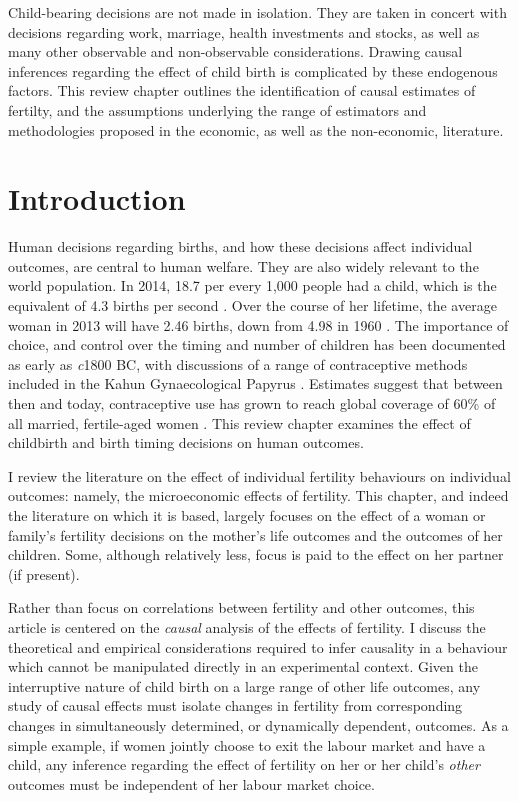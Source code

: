 \begin{chapabstract}
Child-bearing decisions are not made in isolation.  They are taken in concert 
with decisions regarding work, marriage, health investments and stocks, as well 
as many other observable and non-observable considerations.  Drawing causal 
inferences regarding the effect of child birth is complicated by these 
endogenous factors.  This review chapter outlines the identification of causal
estimates of fertilty, and the assumptions underlying the range of estimators
and methodologies proposed in the economic, as well as the non-economic, 
literature.
\end{chapabstract}

\newpage
\section{Introduction}
Human decisions regarding births, and how these decisions affect individual 
outcomes, are central to human welfare.  They are also widely relevant to the
world population.  In 2014, 18.7 per every 1,000 people had a child, which is 
the equivalent of 4.3 births per second \citep{CIA2014}. Over the course of her 
lifetime, the average woman in 2013 will have 2.46 births, down from 4.98 in 
1960 \citep{WorldBank2015}. The importance of choice, and control over the 
timing and number of children has been documented as early as \emph{c}1800 BC, 
with discussions of a range of contraceptive methods included in the Kahun 
Gynaecological Papyrus \citep{OdowdPhillip1994}.  Estimates suggest that 
between then and today,
contraceptive use has grown to reach global coverage of 60\% of all married,
fertile-aged women \citep{Darroch2013}. This review chapter examines the effect 
of childbirth and birth timing decisions on human outcomes.

I review the literature on the effect of individual fertility behaviours on
individual outcomes: namely, the microeconomic effects of fertility.  This
chapter, and indeed the literature on which it is based, largely focuses on 
the effect of a woman or family's fertility decisions on the mother's life 
outcomes and the outcomes of her children.  Some, although relatively less, 
focus is paid to the effect on her partner (if present).  

Rather than focus on correlations between fertility and other outcomes, this 
article is centered on the \emph{causal} analysis of the effects of fertility.  
I discuss the theoretical and empirical considerations required to infer causality 
in a behaviour which cannot be manipulated directly in an experimental context.  
Given the interruptive nature of child birth on a large range of other life 
outcomes, any study of causal effects must isolate changes in fertility from 
corresponding changes in simultaneously determined, or dynamically dependent, 
outcomes.  As a simple example, if women jointly choose to exit the labour 
market and have a child, any inference regarding the effect of fertility on her 
or her child's \emph{other} outcomes must be independent of her labour market 
choice.

